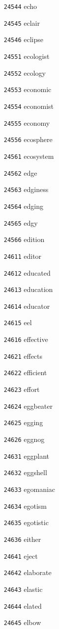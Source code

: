 \documentclass[twoside,11pt]{article}
\begin{document}
\begin{multicols}{5}
\begin{enumerate}
\item[\texttt{24544}] echo
\item[\texttt{24545}] eclair
\item[\texttt{24546}] eclipse
\item[\texttt{24551}] ecologist
\item[\texttt{24552}] ecology
\item[\texttt{24553}] economic
\item[\texttt{24554}] economist
\item[\texttt{24555}] economy
\item[\texttt{24556}] ecosphere
\item[\texttt{24561}] ecosystem
\item[\texttt{24562}] edge
\item[\texttt{24563}] edginess
\item[\texttt{24564}] edging
\item[\texttt{24565}] edgy
\item[\texttt{24566}] edition
\item[\texttt{24611}] editor
\item[\texttt{24612}] educated
\item[\texttt{24613}] education
\item[\texttt{24614}] educator
\item[\texttt{24615}] eel
\item[\texttt{24616}] effective
\item[\texttt{24621}] effects
\item[\texttt{24622}] efficient
\item[\texttt{24623}] effort
\item[\texttt{24624}] eggbeater
\item[\texttt{24625}] egging
\item[\texttt{24626}] eggnog
\item[\texttt{24631}] eggplant
\item[\texttt{24632}] eggshell
\item[\texttt{24633}] egomaniac
\item[\texttt{24634}] egotism
\item[\texttt{24635}] egotistic
\item[\texttt{24636}] either
\item[\texttt{24641}] eject
\item[\texttt{24642}] elaborate
\item[\texttt{24643}] elastic
\item[\texttt{24644}] elated
\item[\texttt{24645}] elbow

\end{enumerate}
\end{multicols}
\end{document}
